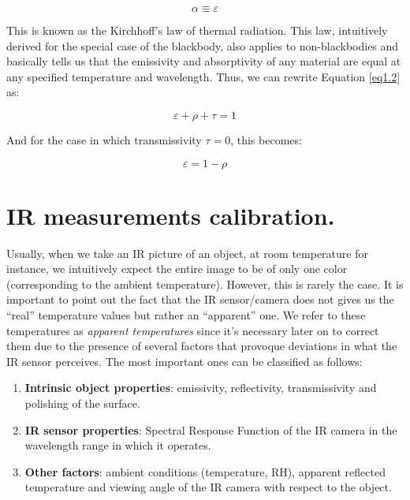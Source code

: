 		\begin{equation}\label{eq1.5}
			\alpha \equiv \varepsilon
		\end{equation}\bigskip	
		
		This is known as the Kirchhoff’s law of thermal radiation. This law, intuitively derived for the special case of the blackbody, also applies to non-blackbodies and basically tells us that the emissivity and absorptivity of any material are equal at any specified temperature and wavelength. Thus, we can rewrite Equation \ref{eq1.2} as:
		
		\begin{equation}\label{eq1.6}
			\varepsilon + \rho + \tau = 1
		\end{equation}\bigskip	
	
		And for the case in which transmissivity $\tau=0$, this becomes:
		
		\begin{equation}\label{eq1.7}
			\varepsilon = 1 - \rho
		\end{equation}\bigskip	
	
	\section{IR measurements calibration.}\label{section1.4}
	
		Usually, when we take an IR picture of an object, at room temperature for instance, we intuitively expect the entire image to be of only one color (corresponding to the ambient temperature). However, this is rarely the case. It is important to point out the fact that the IR sensor/camera does not gives us the “real” temperature values but rather an “apparent” one. We refer to these temperatures as \textit{apparent temperatures} since it’s necessary later on to correct them due to the presence of several factors that provoque deviations in what the IR sensor perceives. The most important ones can be classified as follows:

		\begin{enumerate}[label={\arabic*.}]
			\item \textbf{Intrinsic object properties}: emissivity, reflectivity, transmissivity and polishing of the surface.
			\item \textbf{IR sensor properties}: Spectral Response Function of the IR camera in the wavelength range in which it operates.
			\item \textbf{Other factors}: ambient conditions (temperature, RH), apparent reflected temperature and viewing angle of the IR camera with respect to the object.
		\end{enumerate}
		
